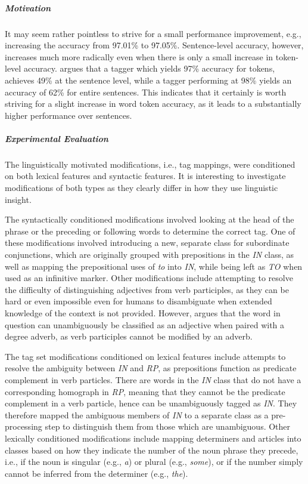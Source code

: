 \documentclass[a4paper,12pt,english]{book}
\begin{document}
\subparagraph{Motivation}
It may seem rather pointless to strive for a small performance improvement,
e.g., increasing the accuracy from 97.01\% to 97.05\%. Sentence-level accuracy,
however, increases much more radically even when there is only a small increase
in token-level accuracy.  argues that a tagger which yields 97\%
accuracy for tokens, achieves 49\% at the sentence level, while a tagger
performing at 98\% yields an accuracy of 62\% for entire sentences. This
indicates that it certainly is worth striving for a slight increase in word
token accuracy, as it leads to a substantially higher performance over
sentences.

\subparagraph{Experimental Evaluation}
The linguistically motivated modifications, i.e., tag mappings, were
conditioned on both lexical features and syntactic features. It is interesting
to investigate modifications of both types as they clearly differ in how they
use linguistic insight.

The syntactically conditioned modifications involved looking at the head of the
phrase or the preceding or following words to determine the correct tag. One of
these modifications involved introducing a new, separate class for subordinate
conjunctions, which are originally grouped with prepositions in the \emph{IN}
class, as well as mapping the prepositional uses of \emph{to} into \emph{IN},
while being left as \emph{TO} when used as an infinitive marker. Other
modifications include attempting to resolve the difficulty of distinguishing
adjectives from verb participles, as they can be hard or even impossible even
for humans to disambiguate when extended knowledge of the context is not
provided. However,  argues that the word in question can
unambiguously be classified as an adjective when paired with a degree adverb,
as verb participles cannot be modified by an adverb.

The tag set modifications conditioned on lexical features include attempts to
resolve the ambiguity between \emph{IN} and \emph{RP}, as prepositions function
as predicate complement in verb particles. There are words in the \emph{IN}
class that do not have a corresponding homograph in \emph{RP}, meaning that
they cannot be the predicate complement in a verb particle, hence can be
unambiguously tagged as \emph{IN}. They therefore mapped the ambiguous members
of \emph{IN} to a separate class as a pre-processing step to distinguish them
from those which are unambiguous. Other lexically conditioned modifications
include mapping determiners and articles into classes based on how they
indicate the number of the noun phrase they precede, i.e., if the noun is
singular (e.g., \emph{a}) or plural (e.g., \emph{some}), or if the number
simply cannot be inferred from the determiner (e.g., \emph{the}).
\end{document}
